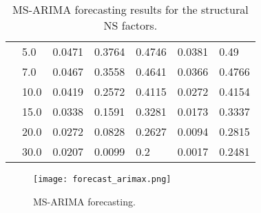 \begin{table}[htbp]
\begin{tabular}{|l|l|l|l|l|l|l|}
                        &5.0&0.0471&0.3764&0.4746&0.0381&0.49\\ \cline{2-7}
                        &7.0&0.0467&0.3558&0.4641&0.0366&0.4766\\ \cline{2-7}
                        &10.0&0.0419&0.2572&0.4115&0.0272&0.4154\\ \cline{2-7}
                        &15.0&0.0338&0.1591&0.3281&0.0173&0.3337\\ \cline{2-7}
                        &20.0&0.0272&0.0828&0.2627&0.0094&0.2815\\ \cline{2-7}
                        &30.0&0.0207&0.0099&0.2&0.0017&0.2481\\ \hline
        \end{tabular}
        \caption{MS-ARIMA forecasting results for the structural NS factors.}
        \label{tab:structuralARIMAX}
    \end{table}


    \begin{figure}[htbp]
        \texttt{[image: forecast\_arimax.png]}
        \caption{MS-ARIMA forecasting.}
        \label{fig:arimax:forecast}
    \end{figure}